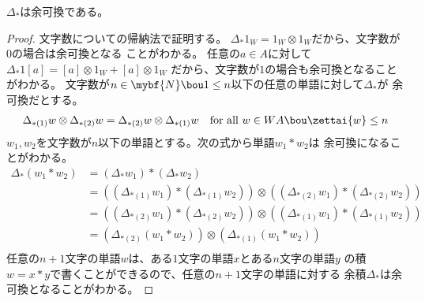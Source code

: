 	\begin{proposition}[連結余積は余可換]\label{prop:連結余積は余可換} %
		$\Delta_*$は余可換である。
	\end{proposition} %
	\begin{proof} %
		文字数についての帰納法で証明する。
		$\Delta_*1_W=1_W\otimes 1_W$だから、文字数が$0$の場合は余可換となる
		ことがわかる。
		任意の$a\in A$に対して$\Delta_*1[a]=[a]\otimes 1_W+[a]\otimes 1_W$
		だから、文字数が$1$の場合も余可換となることがわかる。
		文字数が$n\in\mybf{N}\bou 1\le n$以下の任意の単語に対して$\Delta_*$が
		余可換だとする。
		\begin{equation*}\begin{split} %
			\Delta_{*(1)}w\otimes\Delta_{*(2)}w
			=\Delta_{*(2)}w\otimes\Delta_{*(1)}w
			\quad\text{for all }w\in WA\bou \zettai{w}\le n
		\end{split}\end{equation*} %
		$w_1,w_2$を文字数が$n$以下の単語とする。次の式から単語$w_1*w_2$は
		余可換になることがわかる。
		\begin{equation*}\begin{split} %
			\Delta_*(w_1*w_2) &= (\Delta_*w_1)*(\Delta_*w_2) \\
			&= \left((\Delta_{*(1)}w_1)*(\Delta_{*(1)}w_2)\right)
			\otimes \left((\Delta_{*(2)}w_1)*(\Delta_{*(2)}w_2)\right) \\
			&= \left((\Delta_{*(2)}w_1)*(\Delta_{*(2)}w_2)\right)
			\otimes \left((\Delta_{*(1)}w_1)*(\Delta_{*(1)}w_2)\right) \\
			& = \left(\Delta_{*(2)}(w_1*w_2)\right)
			\otimes \left(\Delta_{*(1)}(w_1*w_2)\right) \\
		\end{split}\end{equation*} %
		任意の$n+1$文字の単語$w$は、ある$1$文字の単語$x$とある$n$文字の単語$y$
		の積$w=x*y$で書くことができるので、任意の$n+1$文字の単語に対する
		余積$\Delta_*$は余可換となることがわかる。
	\end{proof} %

